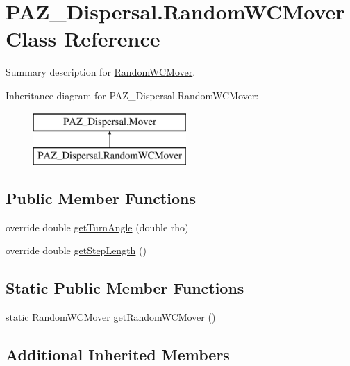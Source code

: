 \hypertarget{class_p_a_z___dispersal_1_1_random_w_c_mover}{\section{P\-A\-Z\-\_\-\-Dispersal.\-Random\-W\-C\-Mover Class Reference}
\label{class_p_a_z___dispersal_1_1_random_w_c_mover}
}


Summary description for \hyperlink{class_p_a_z___dispersal_1_1_random_w_c_mover}{Random\-W\-C\-Mover}.  


Inheritance diagram for P\-A\-Z\-\_\-\-Dispersal.\-Random\-W\-C\-Mover\-:\begin{figure}[H]
\begin{center}
\leavevmode
\includegraphics[height=2.000000cm]{class_p_a_z___dispersal_1_1_random_w_c_mover}
\end{center}
\end{figure}
\subsection*{Public Member Functions}
\begin{DoxyCompactItemize}
\item 
override double \hyperlink{class_p_a_z___dispersal_1_1_random_w_c_mover_a9f47aa9b5810e598290b64d2107de0f0}{get\-Turn\-Angle} (double rho)
\item 
override double \hyperlink{class_p_a_z___dispersal_1_1_random_w_c_mover_a75949600b215d54af0529f883741e884}{get\-Step\-Length} ()
\end{DoxyCompactItemize}
\subsection*{Static Public Member Functions}
\begin{DoxyCompactItemize}
\item 
static \hyperlink{class_p_a_z___dispersal_1_1_random_w_c_mover}{Random\-W\-C\-Mover} \hyperlink{class_p_a_z___dispersal_1_1_random_w_c_mover_a6a9781865404d73fd2ee991a8cba876c}{get\-Random\-W\-C\-Mover} ()
\end{DoxyCompactItemize}
\subsection*{Additional Inherited Members}


